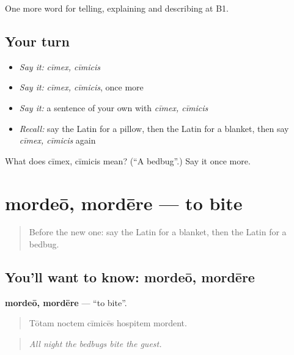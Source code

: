 \begin{grammarlens}[title={What you've built}]
One more word for telling, explaining and describing at B1.
\end{grammarlens}

\subsection*{Your turn}
\begin{itemize}
\raggedright
  \item \emph{Say it:} \emph{cīmex, cīmicis}
  \item \emph{Say it:} \emph{cīmex, cīmicis}, once more
  \item \emph{Say it:} a sentence of your own with \emph{cīmex, cīmicis}
  \item \emph{Recall:} say the Latin for a pillow, then the Latin for a blanket, then say \emph{cīmex, cīmicis} again
\end{itemize}

\begin{tcolorbox}[breakable,colback=teal!4,colframe=teal!35!black,title={Before you move on}]
What does cīmex, cīmicis mean? (\textquotedblleft{}A bedbug\textquotedblright{}.) Say it once more.
\end{tcolorbox}
\section[mordeō, mordēre]{mordeō, mordēre — to bite}

\label{lesson:LA-C447-mordeo}



\begin{quote}
Before the new one: say the Latin for a blanket, then the Latin for a bedbug.
\end{quote}

\subsection*{You'll want to know: mordeō, mordēre}
\textbf{mordeō, mordēre} — \textquotedblleft{}to bite\textquotedblright{}.

\begin{quote}
Tōtam noctem cīmicēs hospitem mordent.
\end{quote}

\begin{quote}
\emph{All night the bedbugs bite the guest.}
\end{quote}

